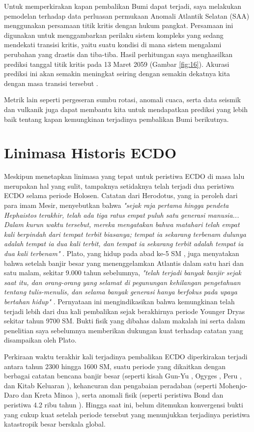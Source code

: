 \documentclass[10pt,twocolumn,letterpaper]{article}
\begin{document}
Untuk memperkirakan kapan pembalikan Bumi dapat terjadi, saya melakukan pemodelan terhadap data perluasan permukaan Anomali Atlantik Selatan (SAA) menggunakan persamaan titik kritis dengan hukum pangkat. Persamaan ini digunakan untuk menggambarkan perilaku sistem kompleks yang sedang mendekati transisi kritis, yaitu suatu kondisi di mana sistem mengalami perubahan yang drastis dan tiba-tiba. Hasil perhitungan saya menghasilkan prediksi tanggal titik kritis pada 13 Maret 2059 (Gambar \ref{fig:16}). Akurasi prediksi ini akan semakin meningkat seiring dengan semakin dekatnya kita dengan masa transisi tersebut \cite{136}.

Metrik lain seperti pergeseran sumbu rotasi, anomali cuaca, serta data seismik dan vulkanik juga dapat membantu kita untuk mendapatkan prediksi yang lebih baik tentang kapan kemungkinan terjadinya pembalikan Bumi berikutnya.

\section{Linimasa Historis ECDO}

Meskipun menetapkan linimasa yang tepat untuk peristiwa ECDO di masa lalu merupakan hal yang sulit, tampaknya setidaknya telah terjadi dua peristiwa ECDO selama periode Holosen. Catatan dari Herodotus, yang ia peroleh dari para imam Mesir, menyebutkan bahwa \textit{"sejak raja pertama hingga pendeta Hephaistos terakhir, telah ada tiga ratus empat puluh satu generasi manusia... Dalam kurun waktu tersebut, mereka mengatakan bahwa matahari telah empat kali berpindah dari tempat terbit biasanya; tempat ia sekarang terbenam dulunya adalah tempat ia dua kali terbit, dan tempat ia sekarang terbit adalah tempat ia dua kali terbenam"} \cite{32}. Plato, yang hidup pada abad ke-5 SM \cite{111}, juga menyatakan bahwa setelah banjir besar yang menenggelamkan Atlantis dalam satu hari dan satu malam, sekitar 9.000 tahun sebelumnya, \textit{"telah terjadi banyak banjir sejak saat itu, dan orang-orang yang selamat di pegunungan kehilangan pengetahuan tentang tulis-menulis, dan selama banyak generasi hanya berfokus pada upaya bertahan hidup"} \cite{112}. Pernyataan ini mengindikasikan bahwa kemungkinan telah terjadi lebih dari dua kali pembalikan sejak berakhirnya periode Younger Dryas sekitar tahun 9700 SM. Bukti fisik yang dibahas dalam makalah ini serta dalam penelitian saya sebelumnya \cite{2} memberikan dukungan kuat terhadap catatan yang disampaikan oleh Plato.

Perkiraan waktu terakhir kali terjadinya pembalikan ECDO diperkirakan terjadi antara tahun 2300 hingga 1600 SM, suatu periode yang dikaitkan dengan berbagai catatan bencana banjir besar (seperti kisah Gun-Yu \cite{113,114,115}, Ogyges \cite{116,117}, Peru \cite{118,119}, dan Kitab Keluaran \cite{120}), kehancuran dan pengabaian peradaban (seperti Mohenjo-Daro \cite{121} dan Kreta Minoa \cite{100,101}), serta anomali fisik (seperti peristiwa Bond \cite{122} dan peristiwa 4.2 ribu tahun \cite{90}). Hingga saat ini, belum ditemukan konvergensi bukti yang cukup kuat setelah periode tersebut yang menunjukkan terjadinya peristiwa katastropik besar berskala global.
\end{document}
